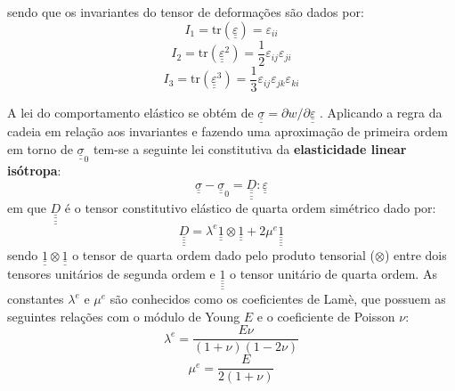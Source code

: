 sendo que os invariantes do tensor de deformações são dados por:
\begin{equation}
	\label{eq:I1}
	I_1 = \text{tr}(\underline{\underline \varepsilon}) = \varepsilon_{ii}
\end{equation}
\begin{equation}
	\label{eq:I2}
	I_2 = \text{tr}(\underline{\underline \varepsilon}^2) = \frac{1}{2} \varepsilon_{ij} \varepsilon_{ji}
\end{equation}
\begin{equation}
	\label{eq:I3}
	I_3 = \text{tr}(\underline{\underline \varepsilon}^3) = \frac{1}{3} \varepsilon_{ij} \varepsilon_{jk} \varepsilon_{ki}
\end{equation}

A lei do comportamento elástico se obtém de $\underline{\underline \sigma} = \partial w / \partial \underline{\underline \varepsilon}$ . Aplicando a regra da cadeia em relação aos invariantes e fazendo uma aproximação de primeira ordem em torno de $\underline{\underline \sigma}_0$ tem-se a seguinte lei constitutiva da \textbf{elasticidade linear isótropa}:
\begin{equation}
	\label{eq:lei_elasticidade}
	\underline{\underline \sigma} - \underline{\underline \sigma}_0 = \underline{\underline{\underline{\underline D}}}:\underline{\underline \varepsilon}
\end{equation}
em que $\underline{\underline{\underline{\underline D}}}$ é o tensor constitutivo elástico de quarta ordem simétrico dado por:
\begin{equation}
	\label{eq:tensor_constitutivo_elastico}
 	\underline{\underline{\underline{\underline D}}} = \lambda^e \underline{\underline 1} \otimes \underline{\underline 1} + 2 \mu^e \underline{\underline{\underline{\underline 1}}}
\end{equation}
sendo $\underline{\underline 1} \otimes \underline{\underline 1}$ o tensor de quarta ordem dado pelo produto tensorial ($\otimes$) entre dois tensores unitários de segunda ordem e $\underline{\underline{\underline{\underline 1}}}$ o tensor unitário de quarta ordem. As constantes $\lambda^e$ e $\mu^e$ são conhecidos como os coeficientes de Lamè, que possuem as seguintes relações com o módulo de Young $E$ e o coeficiente de Poisson $\nu$:
\begin{equation}
	\label{eq:lambdae}
	\lambda^e = \frac{E \nu}{(1+\nu)(1-2\nu)}
\end{equation}
\begin{equation}
	\label{eq:mue}
	\mu^e = \frac{E}{2(1+\nu)}
\end{equation}

